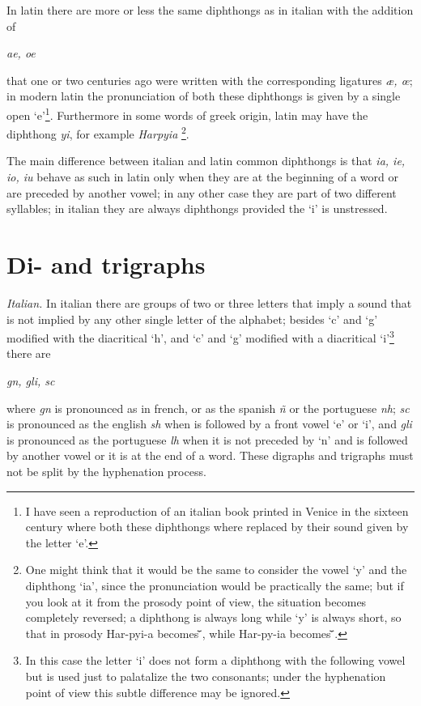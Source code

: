 In latin there are more or less the same diphthongs as
in italian with the addition of
\begin{center}\it  
ae,  oe  
\end{center} 
that  one or two centuries ago were written with the corresponding ligatures
{\it \ae, \oe}; in modern latin the pronunciation of both  these  diphthongs
is  given  by  a  single  open `e'\footnote{I have seen a reproduction of an
italian book printed in Venice in  the  sixteen  century  where  both  these
diphthongs  where  replaced  by  their  sound  given  by  the  letter `e'.}.
Furthermore in some words of greek origin, latin may have the diphthong {\it
yi}, for example {\it Harpyia} \cite{manna}\footnote{One might think that it
would be the same to consider the vowel `y' and the  diphthong  `ia',  since
the  pronunciation would be practically the same; but if you look at it from
the prosody point of view, the  situation  becomes  completely  reversed;  a
diphthong  is  always  long  while  `y'  is always short, so that in prosody
Har-pyi-a becomes \={}\={}\u{}, while Har-py-ia becomes \={}\u{}\={}.}.

The main difference between italian and latin common diphthongs is that {\it
ia, ie, io, iu} behave as such in latin only when they are at the  beginning
of  a word or are preceded by another vowel; in any other case they are part
of two different syllables; in italian they are always diphthongs provided 
the `i' is unstressed.

\section{Di- and trigraphs}
{\it  Italian.}  In  italian  there  are groups of two or three letters that
imply a sound that is  not  implied  by  any  other  single  letter  of  the
alphabet; besides `c' and `g' modified with the diacritical `h', and `c' and
`g' modified with a diacritical `i'\footnote{In this  case  the  letter  `i'
does  not  form  a  diphthong  with  the following vowel but is used just to
palatalize the two consonants; under the  hyphenation  point  of  view  this
subtle difference may be ignored.} there are
 \begin{center}\it gn, gli, sc \end{center}
where  {\it  gn}  is pronounced as in french, or as the spanish {\it \~n} or
the portuguese {\it nh\/}; {\it sc} is pronounced as the  english  {\it  sh}
when is followed by a front vowel `e' or `i', and {\it gli} is pronounced as
the portuguese {\it lh} when it is not preceded by `n' and  is  followed  by
another  vowel  or  it is at the end of a word. These digraphs and trigraphs
must not be split by the hyphenation process.

